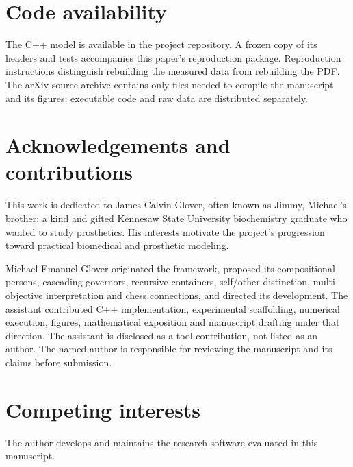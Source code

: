 \documentclass[10pt,a4paper]{article}
\begin{document}
\section*{Code availability}
The C++ model is available in the \href{https://github.com/rmichaelglover/hrl-portfolio/tree/main/virtual-cell-model}{project repository}. A frozen copy of its headers and tests accompanies this paper's reproduction package. Reproduction instructions distinguish rebuilding the measured data from rebuilding the PDF. The arXiv source archive contains only files needed to compile the manuscript and its figures; executable code and raw data are distributed separately.

\section*{Acknowledgements and contributions}
This work is dedicated to James Calvin Glover, often known as Jimmy, Michael's brother: a kind and gifted Kennesaw State University biochemistry graduate who wanted to study prosthetics. His interests motivate the project's progression toward practical biomedical and prosthetic modeling.

Michael Emanuel Glover originated the framework, proposed its compositional persons, cascading governors, recursive containers, self/other distinction, multi-objective interpretation and chess connections, and directed its development. The assistant contributed C++ implementation, experimental scaffolding, numerical execution, figures, mathematical exposition and manuscript drafting under that direction. The assistant is disclosed as a tool contribution, not listed as an author. The named author is responsible for reviewing the manuscript and its claims before submission.

\section*{Competing interests}
The author develops and maintains the research software evaluated in this manuscript.
\end{document}
